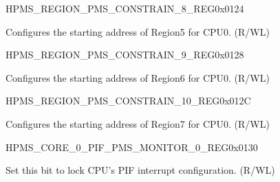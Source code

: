 \begin{register}{H}{PMS\_REGION\_PMS\_CONSTRAIN\_8\_REG}{0x0124}\label{regdesc:PMSREGIONPMSCONSTRAIN8REG}
%
%
\regnewline%
\begin{regdesc}\begin{reglist}
\label{fielddesc:PMSREGIONPMSCONSTRAINADDR5}\item [PMS\_REGION\_PMS\_CONSTRAIN\_ADDR\_5] Configures the starting address of Region5 for CPU0. (R/WL)
\end{reglist}\end{regdesc}
\end{register}


\begin{register}{H}{PMS\_REGION\_PMS\_CONSTRAIN\_9\_REG}{0x0128}\label{regdesc:PMSREGIONPMSCONSTRAIN9REG}
%
%
\regnewline%
\begin{regdesc}\begin{reglist}
\label{fielddesc:PMSREGIONPMSCONSTRAINADDR6}\item [PMS\_REGION\_PMS\_CONSTRAIN\_ADDR\_6] Configures the starting address of Region6 for CPU0. (R/WL)
\end{reglist}\end{regdesc}
\end{register}


\begin{register}{H}{PMS\_REGION\_PMS\_CONSTRAIN\_10\_REG}{0x012C}\label{regdesc:PMSREGIONPMSCONSTRAIN10REG}
%
%
\regnewline%
\begin{regdesc}\begin{reglist}
\label{fielddesc:PMSREGIONPMSCONSTRAINADDR7}\item [PMS\_REGION\_PMS\_CONSTRAIN\_ADDR\_7] Configures the starting address of Region7 for CPU0. (R/WL)
\end{reglist}\end{regdesc}
\end{register}


\begin{register}{H}{PMS\_CORE\_0\_PIF\_PMS\_MONITOR\_0\_REG}{0x0130}\label{regdesc:PMSCORE0PIFPMSMONITOR0REG}
%
%
\regnewline%
\begin{regdesc}\begin{reglist}
\label{fielddesc:PMSCORE0PIFPMSMONITORLOCK}\item [PMS\_CORE\_0\_PIF\_PMS\_MONITOR\_LOCK] Set this bit to lock CPU's PIF interrupt configuration. (R/WL)
\end{reglist}\end{regdesc}
\end{register}



